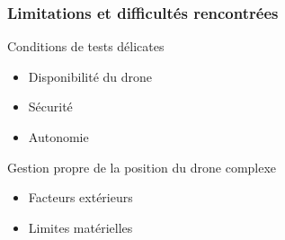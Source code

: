 \begin{frame}
\frametitle{Limitations et difficultés rencontrées}
\begin{center}
\begin{alertblock}{Conditions de tests délicates}
\begin{itemize}
\item Disponibilité du drone
\item Sécurité
\item Autonomie
\end{itemize}
\end{alertblock}
\begin{alertblock}{Gestion propre de la position du drone complexe}
\begin{itemize}
\item Facteurs extérieurs
\item Limites matérielles
\end{itemize}
\end{alertblock}
\end{center}
\end{frame}